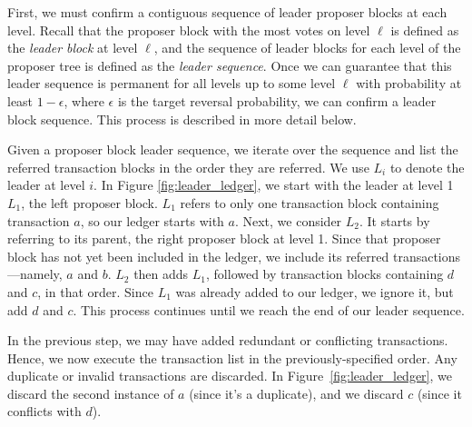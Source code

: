 First, we must confirm a contiguous sequence of leader proposer blocks at each level.  
    Recall that the proposer block with the most votes on level $\ell$ is defined as the \textit{leader block} at level $\ell$, and the sequence of leader blocks for each level of the proposer tree is defined as the {\em leader sequence}. 
Once we can guarantee that this leader sequence is permanent for all levels up to some level $\ell$ with probability at least $1-\epsilon$, where $\epsilon$ is the target reversal probability, we can confirm a leader block sequence. This process is described in more detail below.

    Given a proposer block leader sequence, we iterate over the sequence and list the referred transaction blocks in the  order they are referred. 
    We use $L_i$ to denote the leader at level $i$. 
    In Figure \ref{fig:leader_ledger}, we  start  with the leader at level 1 $L_1$, the left proposer block.
    $L_1$ refers to only one transaction  block containing transaction $a$, so our ledger starts with $a$.
    Next, we consider $L_2$. It starts by referring to its parent, the right proposer block at level 1.
    Since that proposer block has not yet been included in the ledger, we include its referred transactions---namely, $a$ and $b$. 
    $L_2$ then adds $L_1$, followed by transaction blocks containing $d$ and $c$, in that order.
    Since $L_1$ was already added to our ledger, we ignore it, but add $d$ and $c$.
    This process continues until we reach the end of our leader sequence.

 In the previous step, we may have added redundant or conflicting transactions. 
    Hence, we now execute the transaction list in the previously-specified order. Any duplicate or invalid transactions are discarded. 
    In Figure~\ref{fig:leader_ledger}, we discard the second instance of $a$ (since it's a duplicate), and we discard $c$ (since it conflicts with $d$).

